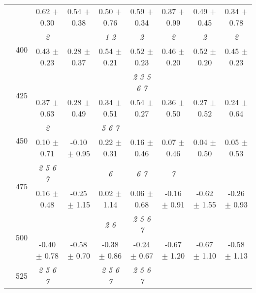 \begin{table}[h]
{\begin{tabular}{
        ccccccccc}
 & & \cellcolor[HTML]{EFEFEF} 0.62 $\pm$ 0.30& \cellcolor[HTML]{EFEFEF} 0.54 $\pm$ 0.38& \cellcolor[HTML]{EFEFEF} 0.50 $\pm$ 0.76& \cellcolor[HTML]{EFEFEF} 0.59 $\pm$ 0.34& \cellcolor[HTML]{EFEFEF} 0.37 $\pm$ 0.99& \cellcolor[HTML]{EFEFEF} 0.49 $\pm$ 0.45& \cellcolor[HTML]{EFEFEF} 0.34 $\pm$ 0.78 \\ 
 & \multirow{2}{*}{400}& \textit{ 2 }& & \textit{ 1 2 }& \textit{ 2 }& \textit{ 2 }& \textit{ 2 }& \textit{ 2 } \\ 
 & & 0.43 $\pm$ 0.23& 0.28 $\pm$ 0.37& 0.54 $\pm$ 0.21& 0.52 $\pm$ 0.23& 0.46 $\pm$ 0.20& 0.52 $\pm$ 0.20& 0.45 $\pm$ 0.23 \\ 
 & \multirow{2}{*}{425}& \cellcolor[HTML]{EFEFEF} & \cellcolor[HTML]{EFEFEF} & \cellcolor[HTML]{EFEFEF} & \cellcolor[HTML]{EFEFEF} \textit{ 2 3 5 6 7 }& \cellcolor[HTML]{EFEFEF} & \cellcolor[HTML]{EFEFEF} & \cellcolor[HTML]{EFEFEF}  \\ 
 & & \cellcolor[HTML]{EFEFEF} 0.37 $\pm$ 0.63& \cellcolor[HTML]{EFEFEF} 0.28 $\pm$ 0.49& \cellcolor[HTML]{EFEFEF} 0.34 $\pm$ 0.51& \cellcolor[HTML]{EFEFEF} 0.54 $\pm$ 0.27& \cellcolor[HTML]{EFEFEF} 0.36 $\pm$ 0.50& \cellcolor[HTML]{EFEFEF} 0.27 $\pm$ 0.52& \cellcolor[HTML]{EFEFEF} 0.24 $\pm$ 0.64 \\ 
 & \multirow{2}{*}{450}& \textit{ 2 }& & \textit{ 5 6 7 }& & & &  \\ 
 & & 0.10 $\pm$ 0.71& -0.10 $\pm$ 0.95& 0.22 $\pm$ 0.31& 0.16 $\pm$ 0.46& 0.07 $\pm$ 0.46& 0.04 $\pm$ 0.50& 0.05 $\pm$ 0.53 \\ 
 & \multirow{2}{*}{475}& \cellcolor[HTML]{EFEFEF} \textit{ 2 5 6 7 }& \cellcolor[HTML]{EFEFEF} & \cellcolor[HTML]{EFEFEF} \textit{ 6 }& \cellcolor[HTML]{EFEFEF} \textit{ 6 7 }& \cellcolor[HTML]{EFEFEF} \textit{ 7 }& \cellcolor[HTML]{EFEFEF} & \cellcolor[HTML]{EFEFEF}  \\ 
 & & \cellcolor[HTML]{EFEFEF} 0.16 $\pm$ 0.48& \cellcolor[HTML]{EFEFEF} -0.25 $\pm$ 1.15& \cellcolor[HTML]{EFEFEF} 0.02 $\pm$ 1.14& \cellcolor[HTML]{EFEFEF} 0.06 $\pm$ 0.68& \cellcolor[HTML]{EFEFEF} -0.16 $\pm$ 0.91& \cellcolor[HTML]{EFEFEF} -0.62 $\pm$ 1.55& \cellcolor[HTML]{EFEFEF} -0.26 $\pm$ 0.93 \\ 
 & \multirow{2}{*}{500}& & & \textit{ 2 6 }& \textit{ 2 5 6 7 }& & &  \\ 
 & & -0.40 $\pm$ 0.78& -0.58 $\pm$ 0.70& -0.38 $\pm$ 0.86& -0.24 $\pm$ 0.67& -0.67 $\pm$ 1.20& -0.67 $\pm$ 1.10& -0.58 $\pm$ 1.13 \\ 
 & \multirow{2}{*}{525}& \cellcolor[HTML]{EFEFEF} \textit{ 2 5 6 7 }& \cellcolor[HTML]{EFEFEF} & \cellcolor[HTML]{EFEFEF} \textit{ 2 5 6 7 }& \cellcolor[HTML]{EFEFEF} \textit{ 2 5 6 7 }& \cellcolor[HTML]{EFEFEF} & \cellcolor[HTML]{EFEFEF} & \cellcolor[HTML]{EFEFEF}  \\ 

\end{tabular}}
\end{table}
